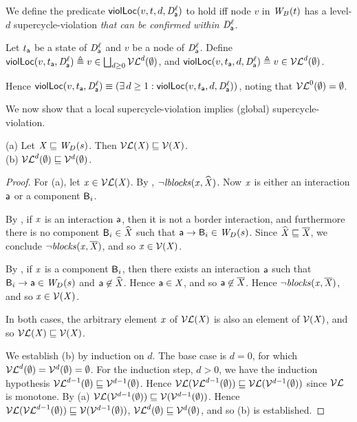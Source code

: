 


We define the predicate $\lviol{v}{d}{t}{\act}{\l}$ to hold iff node $v$ in $\wfg{B}{t}$ has a level-$d$ supercycle-violation
\emph{that can be confirmed within $\dsk{\act}{\l}$}.

\begin{definition}
\label{def:supercycle.violation.local}
\label{defn:supercycle.violation.local}
Let $t_\act$ be a state of $\dsk{\act}{\l}$ and $v$ be a node of $\dsk{\act}{\l}$.
Define 
$\scVL{v}{t_\act}{\act}{\l} \df v \in \JOIN_{d \ge 0} \lVFs^{d} (\ewfg)$, and 
$\scVLd{v}{d}{t_\act}{\act}{\l} \df v \in \lVFs^{d} (\ewfg)$.
\end{definition}
Hence $\scVL{v}{t_\act}{\act}{\l} \ev (\ex d \ge 1: \scVLd{v}{d}{t_\act}{\act}{\l})$, noting that 
$\lVFs^{0} (\ewfg) = \ewfg$.


We now show that a local supercycle-violation implies (global) supercycle-violation.

\begin{proposition}
\label{prop:lV-subg-V}
(a) Let $\XS \subg \lwfg{B}{s}{\DS}$. Then $\lVF{\XS} \subg \VF{\XS}$.\\
(b) $\lVFs^{d} (\ewfg) \subg \VFs^{d} (\ewfg)$.
\end{proposition}
%
\begin{proof}
For (a), let $\ndx \in \lVF{\XS}$. By , $\neg \lblocks{\ndx}{\complL{\XS}}$.
Now $\ndx$ is either an interaction $\act$ or a component $\B_i$. 

By , if $\ndx$ is an interaction $\act$, then it is not a border interaction, and furthermore there is no
component $\B_i \in \complL{\XS}$ such that $\act \ar \B_i \in \lwfg{B}{s}{\DS}$. 
Since $\complL{\XS} \subg \compl{\XS}$, we conclude $\neg \blocks{\ndx}{\compl{\XS}}$, and so $\ndx \in \VF{\XS}$.

By , if $\ndx$ is a component $\B_i$, then there exists an interaction $\act$ such that 
$\B_i \ar \act \in \lwfg{B}{s}{\DS}$ and $\act \not\in \complL{\XS}$. Hence $\act \in \XS$, and so $\act \not\in \compl{\XS}$.
Hence  $\neg \blocks{\ndx}{\compl{\XS}}$, and so $\ndx \in \VF{\XS}$.

In both cases, the arbitrary element $\ndx$ of $\lVF{\XS}$ is also an element of $\VF{\XS}$, and so $\lVF{\XS} \subg \VF{\XS}$.

We establish (b) by induction on $d$. The base case is $d=0$, for which $\lVFs^{d} (\ewfg) = \VFs^{d} (\ewfg) = \ewfg$.
For the induction step, $d > 0$, we have the induction hypothesis $\lVFs^{d-1} (\ewfg) \subg \VFs^{d-1} (\ewfg)$. 
Hence $\lVF{\lVFs^{d-1} (\ewfg)} \subg \lVF{\VFs^{d-1} (\ewfg)}$ since $\lVFs$ is monotone.
By (a) $\lVF{\VFs^{d-1} (\ewfg)} \subg \VF{\VFs^{d-1} (\ewfg)}$. 
Hence  $\lVF{\lVFs^{d-1} (\ewfg)} \subg \VF{\VFs^{d-1} (\ewfg)}$, \ie
  $\lVFs^{d} (\ewfg) \subg \VFs^{d} (\ewfg)$, and so (b) is established.
\end{proof}


